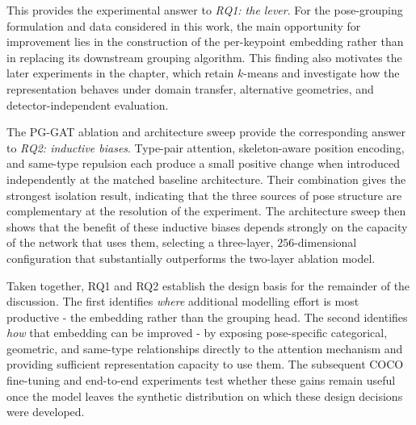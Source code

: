 This provides the experimental answer to \emph{RQ1: the lever}.
For the pose-grouping formulation and data considered in this work,
the main opportunity for improvement lies in the construction of the
per-keypoint embedding rather than in replacing its downstream grouping
algorithm.
This finding also motivates the later experiments in the chapter,
which retain $k$-means and investigate how the representation behaves
under domain transfer,
alternative geometries,
and detector-independent evaluation.

The PG-GAT ablation and architecture sweep provide the corresponding
answer to \emph{RQ2: inductive biases}.
Type-pair attention,
skeleton-aware position encoding,
and same-type repulsion each produce a small positive change when
introduced independently at the matched baseline architecture.
Their combination gives the strongest isolation result,
indicating that the three sources of pose structure are complementary
at the resolution of the experiment.
The architecture sweep then shows that the benefit of these inductive
biases depends strongly on the capacity of the network that uses them,
selecting a three-layer,
$256$-dimensional configuration that substantially outperforms the
two-layer ablation model.

Taken together, RQ1 and RQ2 establish the design basis for the
remainder of the discussion.
The first identifies \emph{where} additional modelling effort is most
productive -
the embedding rather than the grouping head.
The second identifies \emph{how} that embedding can be improved -
by exposing pose-specific categorical,
geometric,
and same-type relationships directly to the attention mechanism
and providing sufficient representation capacity to use them.
The subsequent COCO fine-tuning and end-to-end experiments test whether
these gains remain useful once the model leaves the synthetic
distribution on which these design decisions were developed.
